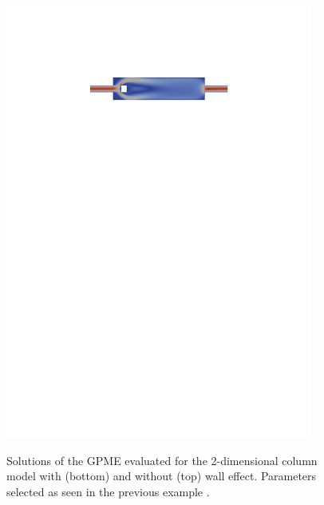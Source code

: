 \documentclass{article}
\begin{document}
\begin{figure}[p]
{   \includegraphics[width=0.9\textwidth,trim=5.5cm 22.5cm 3cm 4cm, clip=true]{fig/velocity_wall.pdf}
}
        \caption[Solutions of the GPME evaluated for the 2-dimensional column model with and without consideration of the wall effect.]{Solutions of the GPME evaluated for the 2-dimensional column model with (bottom) and without (top) wall effect. Parameters selected as seen in the previous example .}\label{fig:column_wall}
\end{figure}
\end{document}
